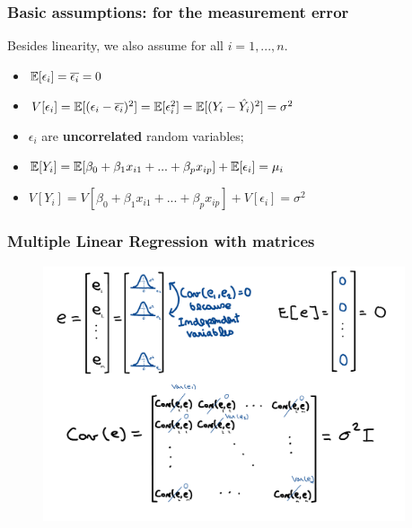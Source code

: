 \begin{frame}
    \frametitle{Basic assumptions: for the measurement error}

    Besides linearity, we also assume for all $i = 1,...,n$. 
    \begin{itemize}

        \item $\operatorname*{\mathbb{E}}[\epsilon_i] = \overline{\epsilon_i} = 0$
        
        \item $V[\epsilon_i] = \operatorname*{\mathbb{E}}[(\epsilon_i - \overline{\epsilon_i})^{2}] = \operatorname*{\mathbb{E}}[\epsilon_{i}^2] = \operatorname*{\mathbb{E}}[(Y_i-\hat{Y_i})^2] = \sigma^{2}$

        \item $\epsilon_i$ are \textbf{uncorrelated} random variables; 
        
        \item $\operatorname*{\mathbb{E}}[Y_i] = \operatorname*{\mathbb{E}}[\beta_0 + \beta_{1}x_{i1} + ... + \beta_{p}x_{ip}] + \operatorname*{\mathbb{E}}[\epsilon_i] = \mu_{i}$
        
        \item $V[Y_i] = V[\beta_0 + \beta_{1}x_{i1} + ... + \beta_{p}x_{ip}] + V[\epsilon_i] = \sigma^2$
    \end{itemize}



\end{frame}



\begin{frame}
    \frametitle{Multiple Linear Regression with matrices}
    \begin{figure}
        \centering
        \includegraphics[width=0.95\textwidth]{sections/introduction/figures/cov_e.pdf}
    \end{figure}
\end{frame}

